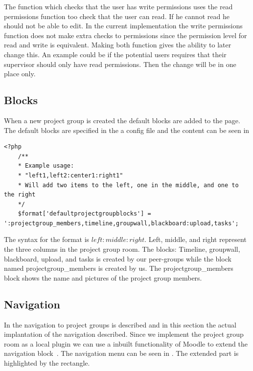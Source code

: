 The function   which checks that the user has write permissions uses the read permissions function too check that the user can read.
If he cannot read he should not be able to edit. 
In the current implementation the write permissions function does not make extra checks to permissions since the permission level for read and write is equivalent.
Making both function gives the ability to later change this.
An example could be if the potential users requires that their supervisor should only have read permissions. 
Then the change will be in one place only. 

\subsection{Blocks}
\label{sec:implprojectgroupblocks}
When a new project group is created the default blocks are added to the page. 
The default blocks are specified in the a config file and the content can be seen in 


\begin{lstlisting}[style=phpCode, caption=\myCaption{The default block configuration}, label=moodledaultblock]
<?php
	/**
	* Example usage:
	* "left1,left2:center1:right1"
	* Will add two items to the left, one in the middle, and one to the right
	*/
	$format['defaultprojectgroupblocks'] = ':projectgroup_members,timeline,groupwall,blackboard:upload,tasks';
\end{lstlisting}
The syntax for the format is $left:middle:right$. 
Left, middle, and right represent the three columns in the project group room. 
The blocks: Timeline, groupwall, blackboard, upload, and tasks is created by our peer-groups while the block named projectgroup\_members is created by us. 
The projectgroup\_members block shows the name and pictures of the project group members. 

	
	






\subsection{Navigation}
In  the navigation to project groups is described and in this section the actual implantation of the navigation described. 
Since we implement the project group room as a local plugin we can use a inbuilt functionality of Moodle to extend the navigation block~\cite{moodleextendnavigationblock}.
The navigation menu can be seen in . The extended part is highlighted by the rectangle. 

